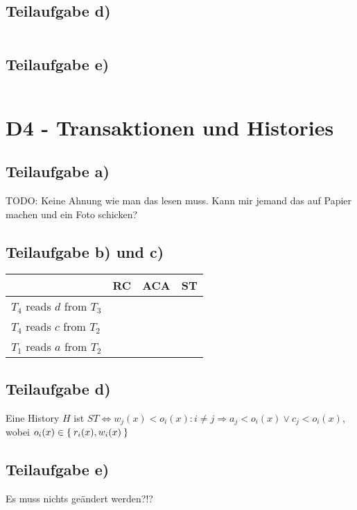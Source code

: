 \documentclass[a4paper,9pt]{scrartcl}
\newcommand{\cmark}{\ding{51}}%
\begin{document}
\subsection{Teilaufgabe d)}
\inputminted[linenos, numbersep=5pt, tabsize=4]{sql}{d3d.sql}

\subsection{Teilaufgabe e)}
\inputminted[linenos, numbersep=5pt, tabsize=4]{sql}{d3e.sql}

\section{D4 - Transaktionen und Histories}
\subsection{Teilaufgabe a)}
TODO: Keine Ahnung wie man das lesen muss. Kann mir jemand das auf
Papier machen und ein Foto schicken?


\subsection{Teilaufgabe b) und c)}
    \begin{tabular}{l|lll}
    ~                          & RC     & ACA    & ST     \\ \hline
    $T_4$ reads $d$ from $T_3$ & \cmark & \cmark & \cmark \\
    $T_4$ reads $c$ from $T_2$ & \cmark & \cmark & \cmark \\
    $T_1$ reads $a$ from $T_2$ & \cmark & \cmark & \cmark \\
    \end{tabular}

\subsection{Teilaufgabe d)}
Eine History $H$ ist $ST \Leftrightarrow w_j(x) < o_i(x): i \neq j \Rightarrow a_j < o_i(x) \lor c_j < o_i(x)$, wobei $o_i(x) \in \Set{r_i(x), w_i(x)}$

\subsection{Teilaufgabe e)}
Es muss nichts geändert werden?!?
\end{document}
